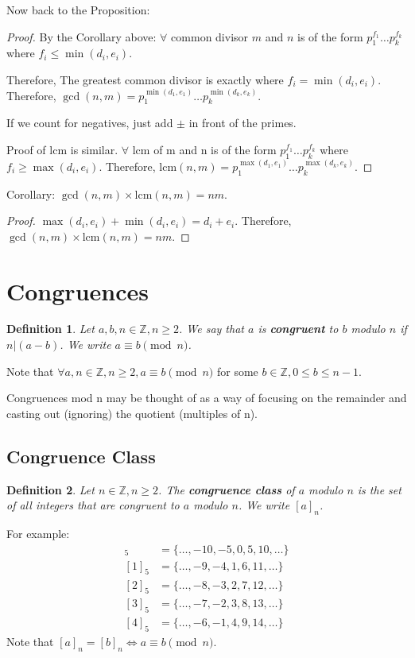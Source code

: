 \documentclass[letterpaper,12pt,oneside]{article}
\newtheorem{definition}{Definition}
\begin{document}
Now back to the Proposition: \begin{proof}
    By the Corollary above: $\forall$ common divisor $m$ and $n$ is of the form $p_1^{f_1}\ldots p_k^{f_k}$ where $f_i \leq \min(d_i,e_i)$.

    Therefore, The greatest common divisor is exactly where $f_i = \min(d_i,e_i)$.
    Therefore, $\gcd(n,m) = p_1^{\min(d_1,e_1)}\ldots p_k^{\min(d_k,e_k)}$.

    If we count for negatives, just add $\pm$ in front of the primes.

    Proof of lcm is similar. $\forall$ lcm of m and n is of the form
    $p_1^{f_1}\ldots p_k^{f_k}$ where $f_i \geq \max(d_i,e_i)$. Therefore,
    $\text{lcm}(n,m) = p_1^{\max(d_1,e_1)}\ldots p_k^{\max(d_k,e_k)}$.
\end{proof}

Corollary: $\gcd(n,m) \times \text{lcm}(n,m) = nm$. \begin{proof}
    $\max(d_i,e_i)+\min(d_i,e_i) = d_i+e_i$. Therefore, $\gcd(n,m) \times \text{lcm}(n,m) = nm$.
\end{proof}


\section{Congruences}
\begin{definition}
    Let $a, b, n \in \mathbb{Z}, n \ge 2$. We say that $a$ is \textbf{congruent} to $b$ modulo $n$ if $n | (a-b)$. We write $a \equiv b \pmod{n}$.
\end{definition}
Note that $\forall a ,n \in \mathbb{Z}, n \ge 2, a\equiv b \pmod{n}$ for some $b \in \mathbb{Z}, 0\le b \le n-1$.

Congruences mod n may be thought of as a way of focusing on the remainder and
casting out (ignoring) the quotient (multiples of n).

\subsection{Congruence Class}
\begin{definition}
    Let $n \in \mathbb{Z}, n \ge 2$. The \textbf{congruence class} of $a$ modulo $n$ is the set of all integers that are congruent to $a$ modulo $n$. We write $[a]_n$.
\end{definition}
For example: \begin{align*}
    [0]_5 & = \{\ldots, -10, -5, 0, 5, 10, \ldots\} \\
    [1]_5 & = \{\ldots, -9, -4, 1, 6, 11, \ldots\}  \\
    [2]_5 & = \{\ldots, -8, -3, 2, 7, 12, \ldots\}  \\
    [3]_5 & = \{\ldots, -7, -2, 3, 8, 13, \ldots\}  \\
    [4]_5 & = \{\ldots, -6, -1, 4, 9, 14, \ldots\}
\end{align*}
Note that $[a]_n = [b]_n \iff a \equiv b \pmod{n}$.
\end{document}
